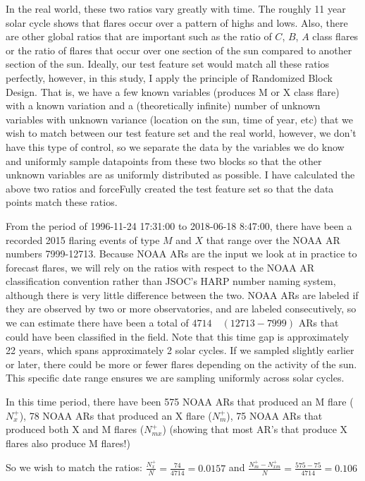 In the real world, these two ratios vary greatly with time. The roughly 11 year solar cycle shows that flares occur over a pattern of highs and lows. Also, there are other global ratios that are important such as the ratio of $C$, $B$, $A$ class flares or the ratio of flares that occur over one section of the sun compared to another section of the sun. Ideally, our test feature set would match all these ratios perfectly, however, in this study, I apply the principle of Randomized Block Design. That is, we have a few known variables (produces M or X class flare) with a known variation and a (theoretically infinite) number of unknown variables with unknown variance (location on the sun, time of year, etc) that we wish to match between our test feature set and the real world, however, we don't have this type of control, so we separate the data by the variables we do know and uniformly sample datapoints from these two blocks so that the other unknown variables are as uniformly distributed as possible. I have calculated the above two ratios and forceFully created the test feature set so that the data points match these ratios. 

From the period of 1996-11-24 17:31:00 to 2018-06-18 8:47:00, there have been a recorded 2015 flaring events of type $M$ and $X$ that range over the NOAA AR numbers 7999-12713. Because NOAA ARs are the input we look at in practice to forecast flares, we will rely on the ratios with respect to the NOAA AR classification convention rather than JSOC's HARP number naming system, although there is very little difference between the two. NOAA ARs are labeled if they are observed by two or more observatories, and are labeled consecutively, so we can estimate there have been a total of $4714 \quad (12713 - 7999)$ ARs that could have been classified in the field. Note that this time gap is approximately 22 years, which spans approximately 2 solar cycles. If we sampled slightly earlier or later, there could be more or fewer flares depending on the activity of the sun. This specific date range ensures we are sampling uniformly across solar cycles.

In this time period, there have been 575 NOAA ARs that produced an M flare ($N_x^+$), 78 NOAA ARs that produced an X flare ($N_m^+$), 75 NOAA ARs that produced both X and M flares ($N_{mx}^+$) (showing that most AR's that produce X flares also produce M flares!)

So we wish to match the ratios: $\frac{N_x^+}{N} = \frac{74}{4714} = 0.0157$ and $\frac{N_m^+ - N_{xm}^+}{N} = \frac{575 - 75}{4714} = 0.106$

